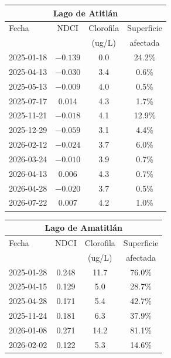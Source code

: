 \documentclass[10pt,a4paper]{article}
\begin{document}
\begin{table}[H]
  \centering
  \small
  \begin{minipage}[t]{0.48\linewidth}
    \centering
    \begin{tabular}{lccc}
      \toprule
      \multicolumn{4}{c}{\textbf{Lago de Atitlán}} \\
      \midrule
      Fecha & NDCI & Clorofila & Superficie \\
            &      & (ug/L)    & afectada \\
      \midrule
      2025-01-18 & $-0.139$ & 0.0 & 24.2\% \\
      2025-04-13 & $-0.030$ & 3.4 & 0.6\%  \\
      2025-05-13 & $-0.009$ & 4.0 & 0.5\%  \\
      2025-07-17 & 0.014    & 4.3 & 1.7\%  \\
      2025-11-21 & $-0.018$ & 4.1 & 12.9\% \\
      2025-12-29 & $-0.059$ & 3.1 & 4.4\%  \\
      2026-02-12 & $-0.024$ & 3.7 & 6.0\%  \\
      2026-03-24 & $-0.010$ & 3.9 & 0.7\%  \\
      2026-04-13 & 0.006    & 4.3 & 0.7\%  \\
      2026-04-28 & $-0.020$ & 3.7 & 0.5\%  \\
      2026-07-22 & 0.007    & 4.2 & 1.0\%  \\
      \bottomrule
    \end{tabular}
  \end{minipage}
  \hfill
  \begin{minipage}[t]{0.48\linewidth}
    \centering
    \begin{tabular}{lccc}
      \toprule
      \multicolumn{4}{c}{\textbf{Lago de Amatitlán}} \\
      \midrule
      Fecha & NDCI & Clorofila & Superficie \\
            &      & (ug/L)    & afectada \\
      \midrule
      2025-01-28 & 0.248 & 11.7 & 76.0\% \\
      2025-04-15 & 0.129 & 5.0  & 28.7\% \\
      2025-04-28 & 0.171 & 5.4  & 42.7\% \\
      2025-11-24 & 0.181 & 6.3  & 37.9\% \\
      2026-01-08 & 0.271 & 14.2 & 81.1\% \\
      2026-02-02 & 0.122 & 5.3  & 14.6\% \\

\end{tabular}
\end{minipage}
\end{table}
\end{document}
